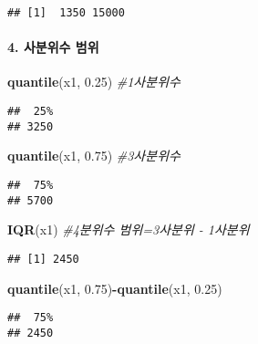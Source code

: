 \documentclass[
]{article}
\newenvironment{Shaded}{\begin{snugshade}}{\end{snugshade}}
\newcommand{\CommentTok}[1]{\textcolor[rgb]{0.56,0.35,0.01}{\textit{#1}}}
\newcommand{\FloatTok}[1]{\textcolor[rgb]{0.00,0.00,0.81}{#1}}
\newcommand{\FunctionTok}[1]{\textcolor[rgb]{0.13,0.29,0.53}{\textbf{#1}}}
\newcommand{\NormalTok}[1]{#1}
\newcommand{\SpecialCharTok}[1]{\textcolor[rgb]{0.81,0.36,0.00}{\textbf{#1}}}
\begin{document}
\begin{verbatim}
## [1]  1350 15000
\end{verbatim}

\hypertarget{uxc0acuxbd84uxc704uxc218-uxbc94uxc704}{%
\paragraph{4. 사분위수
범위}\label{uxc0acuxbd84uxc704uxc218-uxbc94uxc704}}

\begin{Shaded}
\begin{Highlighting}[]
\FunctionTok{quantile}\NormalTok{(x1, }\FloatTok{0.25}\NormalTok{)  }\CommentTok{\#1사분위수}
\end{Highlighting}
\end{Shaded}

\begin{verbatim}
##  25% 
## 3250
\end{verbatim}

\begin{Shaded}
\begin{Highlighting}[]
\FunctionTok{quantile}\NormalTok{(x1, }\FloatTok{0.75}\NormalTok{)  }\CommentTok{\#3사분위수}
\end{Highlighting}
\end{Shaded}

\begin{verbatim}
##  75% 
## 5700
\end{verbatim}

\begin{Shaded}
\begin{Highlighting}[]
\FunctionTok{IQR}\NormalTok{(x1)             }\CommentTok{\#4분위수 범위=3사분위 {-} 1사분위 }
\end{Highlighting}
\end{Shaded}

\begin{verbatim}
## [1] 2450
\end{verbatim}

\begin{Shaded}
\begin{Highlighting}[]
\FunctionTok{quantile}\NormalTok{(x1, }\FloatTok{0.75}\NormalTok{)}\SpecialCharTok{{-}}\FunctionTok{quantile}\NormalTok{(x1, }\FloatTok{0.25}\NormalTok{)}
\end{Highlighting}
\end{Shaded}

\begin{verbatim}
##  75% 
## 2450
\end{verbatim}
\end{document}
